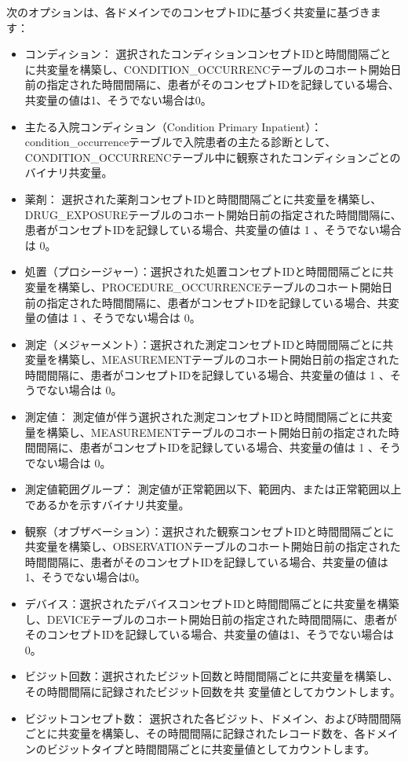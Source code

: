 \documentclass[
  11pt]{book}
\theoremstyle{definition}
\theoremstyle{definition}
\theoremstyle{definition}
\theoremstyle{definition}
\theoremstyle{remark}
\begin{document}
次のオプションは、各ドメインでのコンセプトIDに基づく共変量に基づきます：

\begin{itemize}
\item
  コンディション： 選択されたコンディションコンセプトIDと時間間隔ごとに共変量を構築し、CONDITION\_OCCURRENCテーブルのコホート開始日前の指定された時間間隔に、患者がそのコンセプトIDを記録している場合、共変量の値は1、そうでない場合は0。
\item
  主たる入院コンディション（Condition Primary Inpatient）： condition\_occurrenceテーブルで入院患者の主たる診断として、CONDITION\_OCCURRENCテーブル中に観察されたコンディションごとのバイナリ共変量。
\item
  薬剤： 選択された薬剤コンセプトIDと時間間隔ごとに共変量を構築し、DRUG\_EXPOSUREテーブルのコホート開始日前の指定された時間間隔に、患者がコンセプトIDを記録している場合、共変量の値は 1 、そうでない場合は 0。
\item
  処置（プロシージャー）：選択された処置コンセプトIDと時間間隔ごとに共変量を構築し、PROCEDURE\_OCCURRENCEテーブルのコホート開始日前の指定された時間間隔に、患者がコンセプトIDを記録している場合、共変量の値は 1 、そうでない場合は 0。
\item
  測定（メジャーメント）：選択された測定コンセプトIDと時間間隔ごとに共変量を構築し、MEASUREMENTテーブルのコホート開始日前の指定された時間間隔に、患者がコンセプトIDを記録している場合、共変量の値は 1 、そうでない場合は 0。
\item
  測定値： 測定値が伴う選択された測定コンセプトIDと時間間隔ごとに共変量を構築し、MEASUREMENTテーブルのコホート開始日前の指定された時間間隔に、患者がコンセプトIDを記録している場合、共変量の値は 1 、そうでない場合は 0。
\item
  測定値範囲グループ： 測定値が正常範囲以下、範囲内、または正常範囲以上であるかを示すバイナリ共変量。
\item
  観察（オブザベーション）：選択された観察コンセプトIDと時間間隔ごとに共変量を構築し、OBSERVATIONテーブルのコホート開始日前の指定された時間間隔に、患者がそのコンセプトIDを記録している場合、共変量の値は1、そうでない場合は0。
\item
  デバイス：選択されたデバイスコンセプトIDと時間間隔ごとに共変量を構築し、DEVICEテーブルのコホート開始日前の指定された時間間隔に、患者がそのコンセプトIDを記録している場合、共変量の値は1、そうでない場合は0。
\item
  ビジット回数：選択されたビジット回数と時間間隔ごとに共変量を構築し、その時間間隔に記録されたビジット回数を共 変量値としてカウントします。
\item
  ビジットコンセプト数： 選択された各ビジット、ドメイン、および時間間隔ごとに共変量を構築し、その時間間隔に記録されたレコード数を、各ドメインのビジットタイプと時間間隔ごとに共変量値としてカウントします。
\end{itemize}
\end{document}
